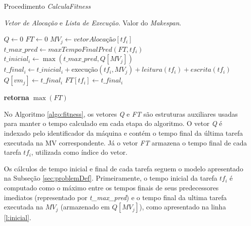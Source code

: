 \begin{algorithm}[H]
\caption{Procedimento \textit{CalculaFitness}}\label{algo:fitness}

\begin{algorithmic}[1]
\Require \textit{Vetor de Alocação} e \textit{Lista de Execução}.
\Ensure Valor do \textit{Makespan}.

    \State $Q \gets 0$ 
    \State $FT \gets 0$
        \State $MV_j \gets \textit{vetorAlocação}[tf_i]$
        \State $t\_max\_pred \gets maxTempoFinalPred(FT, tf_i)$
        \State $t\_inicial_i \gets \max{(t\_max\_pred, Q[MV_j])} $ \label{l:inicial}
        \State $t\_final_i \gets t\_inicial_i + \text{execução}(tf_i, MV_j) + leitura(tf_i) + escrita(tf_i)$ \label{l:final}
        \State $Q[vm_j] \gets t\_final_i$
        \State $FT[tf_i] \gets t\_final_i$
    \EndFor

    \State \textbf{retorna} $\max(FT)$ \label{l:fitretorno}


\end{algorithmic}
\end{algorithm}

No Algoritmo \ref{algo:fitness}, os vetores \textit{Q} e \textit{FT} são estruturas auxiliares usadas para manter o tempo calculado em cada etapa do algoritmo. O vetor \textit{Q} é indexado pelo identificador da máquina  e contém o tempo final da última tarefa executada na MV correspondente. Já o vetor \textit{FT} armazena o tempo final de cada tarefa $tf_i$, utilizada como índice do vetor.


Os cálculos de tempo inicial e final de cada tarefa seguem o modelo apresentado na Subseção \ref{sec:problemDef}. Primeiramente, o tempo inicial da tarefa $tf_i$ é computado como o máximo entre os tempos finais de seus predecessores imediatos (representado por \textit{t\_max\_pred}) e o tempo final da ultima tarefa executada na $MV_j$ (armazenado em $Q[MV_j]$), como apresentado na linha \ref{l:inicial}.


